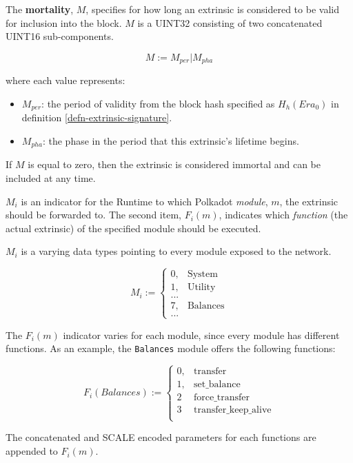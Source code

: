 \begin{definition}
    \label{defn-extrinsic-mortality}
    The \textbf{mortality}, $M$, specifies for how long an extrinsic is considered to
    be valid for inclusion into the block. $M$ is a UINT32 consisting of two concatenated
    UINT16 sub-components.

    \[
        M := M_{per} | M_{pha}
    \]

    where each value represents:

    \begin{itemize}
        \item $M_{per}$: the period of validity from the block hash
        specified as $H_h(Era_0)$ in definition \ref{defn-extrinsic-signature}.
        \item $M_{pha}$: the phase in the period that this extrinsic's lifetime begins.
    \end{itemize}

    If $M$ is equal to zero, then the extrinsic is considered immortal and can
    be included at any time.

\end{definition}

\begin{definition}
    \label{defn-module-indicator}
    $M_i$ is an indicator for the Runtime to which Polkadot \textit{module},
    $m$, the extrinsic should be forwarded to. The second item, $F_i(m)$,
    indicates which \textit{function} (the actual extrinsic) of the specified
    module should be executed.
    \newline

    $M_i$ is a varying data types pointing to every module exposed to the
    network.

    \[
    M_i :=
    \begin{cases}
    0, & \text{System} \\
    1, & \text{Utility} \\
    ... & \\
    7, & \text{Balances} \\
    ... &
    \end{cases}
    \]
\end{definition}

\begin{definition}
    \label{defn-function-indicator}
    The $F_i(m)$ indicator varies for each module, since every module has
    different functions. As an example, the \verb|Balances| module offers the
    following functions:

    \[
    F_i(Balances) :=
    \begin{cases}
    0, & \text{transfer} \\
    1, & \text{set\_balance} \\
    2 & \text{force\_transfer} \\
    3 & \text{transfer\_keep\_alive} \\
    \end{cases}
    \]

    The concatenated and SCALE encoded parameters for each functions are
    appended to $F_i(m)$.
\end{definition}
